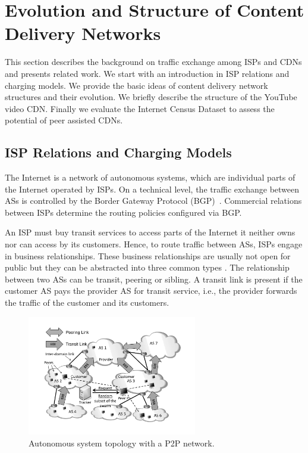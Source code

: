 \section{Evolution and Structure of Content Delivery Networks}\label{sec:aslevel:background}

This section describes the background on traffic exchange among ISPs and CDNs and presents related work.
We start with an introduction in ISP relations and charging models.
We provide the basic ideas of content delivery network structures and their evolution.
We briefly describe the structure of the YouTube video CDN.
Finally we evaluate the Internet Census Dataset to assess the potential of peer assisted CDNs.

\subsection{ISP Relations and Charging Models}

The Internet is a network of autonomous systems, which are individual parts of the Internet operated by ISPs.
On a technical level, the traffic exchange between ASs is controlled by the Border Gateway Protocol (BGP)~\cite{trangia2009}.
Commercial relations between ISPs determine the routing policies configured via BGP.

An ISP must buy transit services to access parts of the Internet it neither owns nor can access by its customers.
Hence, to route traffic between ASs, ISPs engage in business relationships.
These business relationships are usually not open for public but they can be abstracted into three common types \cite{gao2001}.
The relationship between two ASs can be transit, peering or sibling.
A transit link is present if the customer AS pays the provider AS for transit service, i.e., the provider forwards the traffic of the customer and its customers.

\begin{figure}[bt]
\centering
	\includegraphics[width=0.66\textwidth]{aslevel/figs/p2p}
 	\caption{Autonomous system topology with a P2P network.}
 	\label{fig:aslevel:p2p}
\end{figure}

